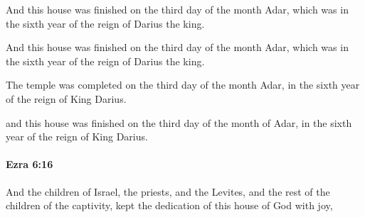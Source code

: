 			And this house was finished on the third day of the month Adar, which was in the sixth year of the reign of Darius the king.

			\begin{versebox}
					\item[BHS] 
					\item[LXX] 
					\item[ASV] And this house was finished on the third day of the month Adar, which was in the sixth year of the reign of Darius the king.
					\item[NIV] The temple was completed on the third day of the month Adar, in the sixth year of the reign of King Darius.
					\item[NRSV] and this house was finished on the third day of the month of Adar, in the sixth year of the reign of King Darius.
			\end{versebox}

		\paragraph{Ezra 6:16} %
			\label{EZRA-6-16}

			And the children of Israel, the priests, and the Levites, and the rest of the children of the captivity, kept the dedication of this house of God with joy,

